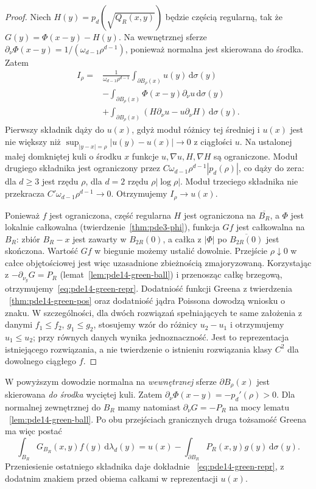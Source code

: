 \begin{proof}
Niech $H(y)=p_d(\sqrt{Q_R(x,y)})$ będzie częścią
regularną, tak że $G(y)=\Phi(x-y)-H(y)$.
Na wewnętrznej sferze $\partial_\nu\Phi(x-y)
=1/(\omega_{d-1}\rho^{d-1})$, ponieważ normalna
jest skierowana do środka. Zatem
\begin{align*}
 I_\rho={}&\frac{1}{\omega_{d-1}\rho^{d-1}}
 \int_{\partial B_\rho(x)}u(y)\,\mathrm d\sigma(y)\\
 &-\int_{\partial B_\rho(x)}\Phi(x-y)\partial_\nu u
 \,\mathrm d\sigma(y)\\
 &+\int_{\partial B_\rho(x)}
 (H\partial_\nu u-u\partial_\nu H)\,\mathrm d\sigma(y).
\end{align*}
Pierwszy składnik dąży do $u(x)$, gdyż moduł różnicy
tej średniej i $u(x)$ jest nie większy niż
$\sup_{|y-x|=\rho}|u(y)-u(x)|\to0$ z ciągłości $u$.
Na ustalonej małej domkniętej kuli o środku $x$ funkcje
$u,\nabla u,H,\nabla H$ są ograniczone.
Moduł drugiego składnika jest ograniczony przez
$C\omega_{d-1}\rho^{d-1}|p_d(\rho)|$, co dąży do
zera: dla $d\ge3$ jest rzędu $\rho$, dla $d=2$
rzędu $\rho|\log\rho|$. Moduł trzeciego składnika
nie przekracza $C'\omega_{d-1}\rho^{d-1}\to0$.
Otrzymujemy $I_\rho\to u(x)$.

Ponieważ $f$ jest ograniczona, część regularna $H$
jest ograniczona na $\overline{B_R}$, a $\Phi$ jest
lokalnie całkowalna (twierdzenie~\ref{thm:pde3-phi}),
funkcja $Gf$ jest całkowalna na $B_R$:
zbiór $B_R-x$ jest zawarty w $B_{2R}(0)$, a całka
z $|\Phi|$ po $\overline{B_{2R}(0)}$ jest skończona.
Wartość $Gf$ w biegunie możemy ustalić dowolnie.
Przejście $\rho\downarrow0$ w całce objętościowej
jest więc uzasadnione zbieżnością zmajoryzowaną.
Korzystając z $-\partial_{\nu_y}G=P_R$
(lemat~\ref{lem:pde14-green-ball}) i przenosząc całkę
brzegową, otrzymujemy~\eqref{eq:pde14-green-repr}.
Dodatniość funkcji Greena z twierdzenia
~\ref{thm:pde14-green-pos} oraz dodatniość jądra
Poissona dowodzą wniosku o znaku.
W szczególności, dla dwóch rozwiązań spełniających
te same założenia z danymi $f_1\le f_2$, $g_1\le g_2$,
stosujemy wzór do różnicy $u_2-u_1$ i otrzymujemy
$u_1\le u_2$; przy równych danych wynika jednoznaczność.
Jest to reprezentacja istniejącego rozwiązania,
a nie twierdzenie o istnieniu rozwiązania klasy $C^2$
dla dowolnego ciągłego $f$.
\end{proof}

\begin{uwaga}
W powyższym dowodzie normalna na \emph{wewnętrznej}
sferze $\partial B_\rho(x)$ jest skierowana \emph{do środka}
wyciętej kuli. Zatem
$\partial_\nu\Phi(x-y)=-p_d'(\rho)>0$.
Dla normalnej zewnętrznej do $B_R$ mamy natomiast
$\partial_\nu G=-P_R$ na mocy lematu
~\ref{lem:pde14-green-ball}. Po obu przejściach granicznych
druga tożsamość Greena ma więc postać
\[
 \int_{B_R}G_{B_R}(x,y)f(y)\,\mathrm d\lambda_d(y)
 =u(x)-\int_{\partial B_R}P_R(x,y)g(y)\,\mathrm d\sigma(y).
\]
Przeniesienie ostatniego składnika daje dokładnie
~\eqref{eq:pde14-green-repr}, z dodatnim znakiem przed
obiema całkami w reprezentacji $u(x)$.
\end{uwaga}

